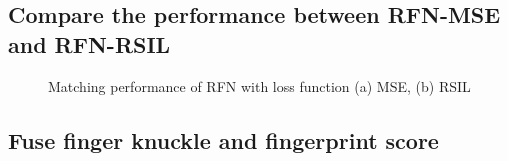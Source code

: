 \subsection{Compare the performance between RFN-MSE and RFN-RSIL}


\begin{figure}[h]
    \centering

    \caption{Matching performance of RFN with loss function (a) MSE, (b) RSIL}
    \label{rfn-roc}
\end{figure}

\subsection{Fuse finger knuckle and fingerprint score}
